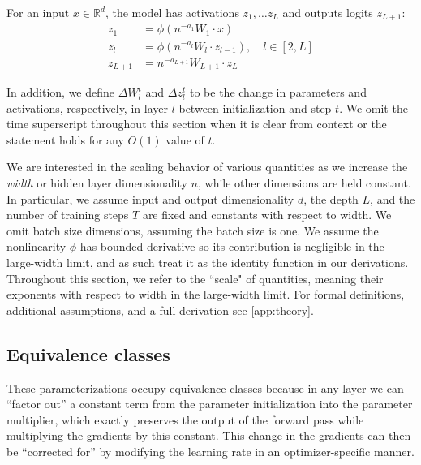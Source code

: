\documentclass{article}
\theoremstyle{plain}
\theoremstyle{definition}
\theoremstyle{remark}
\newcommand{\R}{\mathbb{R}}
\begin{document}
For an input $x \in \R^d$, the model has activations $z_1, \ldots z_L$ and outputs logits $z_{L+1}$:
\begingroup
\begin{align*}
    z_1 &= \phi(n^{-a_1} W_1 \cdot x)\\
    z_l &= \phi(n^{-a_l} W_l \cdot z_{l-1}), \quad l \in [2, L]\\
    z_{L+1} &= n^{-a_{L+1}} W_{L+1} \cdot z_L
\end{align*}
\endgroup

In addition, we define $\Delta W_l^t$ and $\Delta z_l^t$ to be the change in parameters and activations, respectively, in layer $l$ between initialization and step $t$. We omit the time superscript throughout this section when it is clear from context or the statement holds for any $O(1)$ value of $t$.

We are interested in the scaling behavior of various quantities as we increase the \emph{width} or hidden layer dimensionality $n$, while other dimensions are held constant. In particular, we assume input and output dimensionality $d$, the depth $L$, and the number of training steps $T$ are fixed and constants with respect to width. We omit batch size dimensions, assuming the batch size is one. We assume the nonlinearity $\phi$ has bounded derivative so its contribution is negligible in the large-width limit, and as such treat it as the identity function in our derivations. Throughout this section, we refer to the ``scale" of quantities, meaning their exponents with respect to width in the large-width limit. For formal definitions, additional assumptions, and a full derivation see \cref{app:theory}.

\subsection{Equivalence classes}
\label{sec:equivalence_relations}
These parameterizations occupy equivalence classes because in any layer we can ``factor out'' a constant term from the parameter initialization into the parameter multiplier, which exactly preserves the output of the forward pass while multiplying the gradients by this constant. This change in the gradients can then be ``corrected for'' by modifying the learning rate in an optimizer-specific manner.
\end{document}
